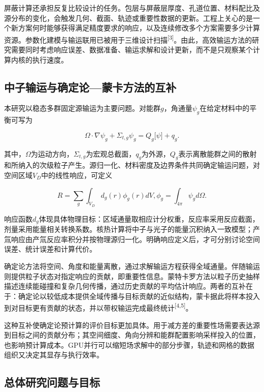 \documentclass[UTF8, zihao=-4, fontset=none, a4paper]{ctexart}
\newcommand{\upcite}[1]{\textsuperscript{[#1]}}
\begin{document}
屏蔽计算还承担反复比较设计的任务。包层与屏蔽层厚度、孔道位置、材料配比及源分布的变化，会触发几何、截面、轨迹或重要性数据的更新。工程上关心的是一个新方案何时能够获得满足精度要求的响应，以及连续修改多个方案需要多少计算资源。参数化建模与输运联用已被用于三维设计扫描\upcite{3}。由此，高效输运方法的研究需要同时考虑响应误差、数据准备、输运求解和设计更新，而不是只观察某个计算内核的执行速度。

\subsection{中子输运与确定论---蒙卡方法的互补}

本研究以稳态多群固定源输运为主要问题。对能群\(g\)，角通量\(\psi_{g}\)在给定材料中的平衡可写为

\begin{equation}
\Omega \cdot \nabla\psi_{g} + \Sigma_{t,g}\psi_{g} = Q_{g}\lbrack\psi\rbrack + q_{g}.
\label{eq:1}
\end{equation}

其中，\(\Omega\)为运动方向，\(\Sigma_{t,g}\)为宏观总截面，\(q_{g}\)为外源，\(Q_{g}\)表示离散能群之间的散射和所纳入的次级粒子产生。源归一化、材料密度及边界条件共同确定输运问题，对空间区域\(V_{D}\)中的线性响应，可定义

\begin{equation}
R = \sum_{g}^{}{\int_{V_{D}}^{}{d_{g}(r)\phi_{g}(r)dV}},\phi_{g} = \int_{4\pi}^{}{\psi_{g}d\Omega}.
\label{eq:2}
\end{equation}

响应函数\(d_{g}\)体现具体物理目标：区域通量取相应计分权重，反应率采用反应截面，剂量采用能量相关转换系数。核热计算将中子与光子的能量沉积纳入一致模型；产氚响应由产氚反应率积分并按物理源归一化。明确响应定义后，才可分别讨论空间误差、统计误差和计算代价。

确定论方法将空间、角度和能量离散，通过求解输运方程获得全域通量。伴随输运则提供粒子状态对指定响应的贡献，即重要性信息。蒙特卡罗方法以粒子历史抽样描述连续能碰撞和复杂几何传播，通过历史贡献的平均估计响应。两者的互补在于：确定论以较低成本提供全域传播与目标贡献的近似结构，蒙卡据此将样本投入到对目标更有贡献的状态，并以带权输运完成最终统计\upcite{4,5}。

这种互补使确定论预计算的评价目标更加具体。用于减方差的重要性场需要表达源到目标之间的贡献分布；其空间细度、角向分辨和能群配置影响采样投入的位置，也影响预计算成本。GPU并行可以缩短场求解中的部分步骤，轨迹和网格的数据组织又决定其显存与执行效率。

\subsection{总体研究问题与目标}
\end{document}
